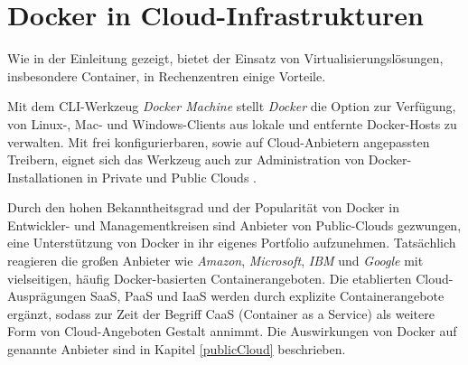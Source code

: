 \documentclass[../main.tex]{subfiles}
\begin{document}
\chapter{Docker in Cloud-Infrastrukturen}
\label{secInfrastructure}
  Wie in der Einleitung gezeigt, bietet der Einsatz von Virtualisierungslösungen, insbesondere Container, in Rechenzentren einige Vorteile.


  Mit dem CLI-Werkzeug \emph{Docker Machine} stellt \emph{Docker} die Option zur Verfügung, von Linux-, Mac- und Windows-Clients aus lokale und entfernte Docker-Hosts zu verwalten. Mit frei konfigurierbaren, sowie auf Cloud-Anbietern angepassten Treibern, eignet sich das Werkzeug auch zur Administration von Docker-Installationen in Private und Public Clouds \cite{https://docs.docker.com/machine/overview/}\cite{https://docs.docker.com/machine/drivers/generic/}\cite{https://docs.docker.com/machine/get-started-cloud/}.

  Durch den hohen Bekanntheitsgrad und der Popularität von Docker in Entwickler- und Managementkreisen sind Anbieter von Public-Clouds gezwungen, eine Unterstützung von Docker in ihr eigenes Portfolio aufzunehmen. Tatsächlich reagieren die großen Anbieter wie \emph{Amazon}, \emph{Microsoft}, \emph{IBM} und \emph{Google} mit vielseitigen, häufig Docker-basierten Containerangeboten. Die etablierten Cloud-Ausprägungen SaaS, PaaS und IaaS werden durch explizite Containerangebote ergänzt, sodass zur Zeit der Begriff CaaS (Container as a Service) als weitere Form von Cloud-Angeboten Gestalt annimmt. Die Auswirkungen von Docker auf genannte Anbieter sind in Kapitel \ref{publicCloud} beschrieben.
\end{document}
